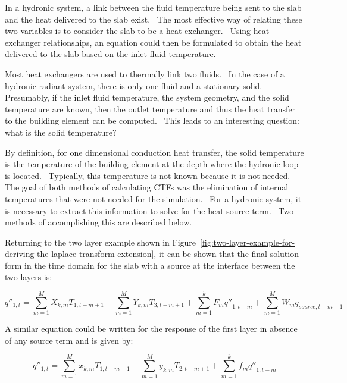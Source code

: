 In a hydronic system, a link between the fluid temperature being sent to the slab and the heat delivered to the slab exist.~ The most effective way of relating these two variables is to consider the slab to be a heat exchanger.~ Using heat exchanger relationships, an equation could then be formulated to obtain the heat delivered to the slab based on the inlet fluid temperature.

Most heat exchangers are used to thermally link two fluids.~ In the case of a hydronic radiant system, there is only one fluid and a stationary solid.~ Presumably, if the inlet fluid temperature, the system geometry, and the solid temperature are known, then the outlet temperature and thus the heat transfer to the building element can be computed.~ This leads to an interesting question:~ what is the solid temperature?

By definition, for one dimensional conduction heat transfer, the solid temperature is the temperature of the building element at the depth where the hydronic loop is located.~ Typically, this temperature is not known because it is not needed.~ The goal of both methods of calculating CTFs was the elimination of internal temperatures that were not needed for the simulation.~ For a hydronic system, it is necessary to extract this information to solve for the heat source term.~ Two methods of accomplishing this are described below.

Returning to the two layer example shown in Figure~\ref{fig:two-layer-example-for-deriving-the-laplace-transform-extension}, it can be shown that the final solution form in the time domain for the slab with a source at the interface between the two layers is:

\begin{equation}
{q''_{1,t}} = \sum\limits_{m = 1}^M {{X_{k,m}}{T_{1,t - m + 1}}}  - \sum\limits_{m = 1}^M {{Y_{k,m}}{T_{3,t - m + 1}}}  + \sum\limits_{m = 1}^k {{F_m}{{q''}_{1,t - m}}}  + \sum\limits_{m = 1}^M {{W_m}{q_{source,t - m + 1}}}
\label{eq:QTFDeriv662}
\end{equation}

A similar equation could be written for the response of the first layer in absence of any source term and is given by:

\begin{equation}
{q''_{1,t}} = \sum\limits_{m = 1}^M {{x_{k,m}}{T_{1,t - m + 1}}}  - \sum\limits_{m = 1}^M {{y_{k,m}}{T_{2,t - m + 1}}}  + \sum\limits_{m = 1}^k {{f_m}{{q''}_{1,t - m}}}
\label{eq:QTFDeriv663}
\end{equation}

